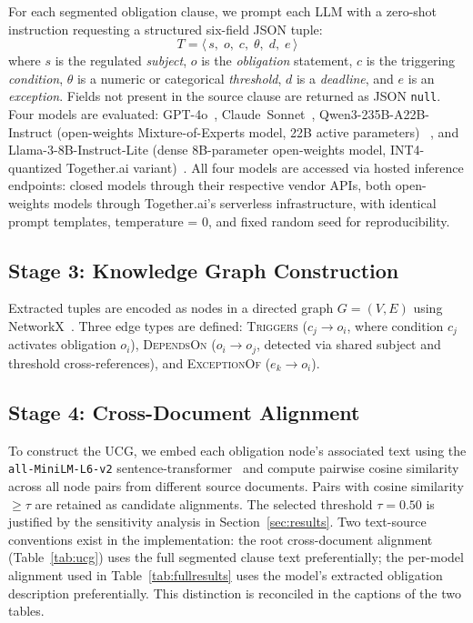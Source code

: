\documentclass{article}
\begin{document}
For each segmented obligation clause, we prompt each LLM with a
zero-shot instruction requesting a structured six-field JSON tuple:
\begin{equation}
T = \langle\, s,\; o,\; c,\; \theta,\; d,\; e \,\rangle
\end{equation}
where $s$ is the regulated \textit{subject}, $o$ is the
\textit{obligation} statement, $c$ is the triggering \textit{condition},
$\theta$ is a numeric or categorical \textit{threshold}, $d$ is a
\textit{deadline}, and $e$ is an \textit{exception}.
Fields not present in the source clause are returned as JSON \texttt{null}.
Four models are evaluated: GPT-4o~\cite{openai2024},
Claude~Sonnet~\cite{anthropic2024}, Qwen3-235B-A22B-Instruct
(open-weights Mixture-of-Experts model, 22B active parameters)
~\cite{qwen2024}, and Llama-3-8B-Instruct-Lite
(dense 8B-parameter open-weights model, INT4-quantized Together.ai
variant)~\cite{llama2024}.
All four models are accessed via hosted inference endpoints: closed
models through their respective vendor APIs, both open-weights models
through Together.ai's serverless infrastructure, with identical
prompt templates, temperature = 0, and fixed random seed for
reproducibility.

\subsection{Stage 3: Knowledge Graph Construction}

Extracted tuples are encoded as nodes in a directed graph $G=(V,E)$
using NetworkX~\cite{networkx2008}.
Three edge types are defined: \textsc{Triggers}
($c_j \rightarrow o_i$, where condition $c_j$ activates obligation
$o_i$), \textsc{DependsOn} ($o_i \rightarrow o_j$, detected via shared
subject and threshold cross-references), and \textsc{ExceptionOf}
($e_k \rightarrow o_i$).

\subsection{Stage 4: Cross-Document Alignment}

To construct the UCG, we embed each obligation node's associated text
using the \texttt{all-MiniLM-L6-v2} sentence-transformer~\cite{reimers2019}
and compute pairwise cosine similarity across all node pairs from
different source documents.
Pairs with cosine similarity $\geq \tau$ are retained as candidate
alignments.
The selected threshold $\tau=0.50$ is justified by the sensitivity
analysis in Section~\ref{sec:results}.
Two text-source conventions exist in the implementation: the root
cross-document alignment (Table~\ref{tab:ucg}) uses the full segmented
clause text preferentially; the per-model alignment used in
Table~\ref{tab:fullresults} uses the model's extracted obligation
description preferentially. This distinction is reconciled in the
captions of the two tables.
\end{document}
